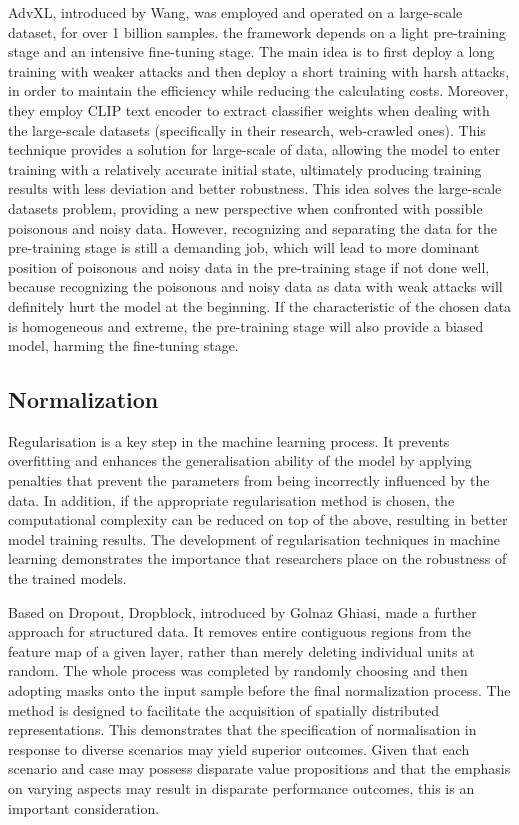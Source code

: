 \documentclass{article}
\begin{document}
AdvXL\cite{wang2024revisitingadversarialtrainingscale}, introduced by Wang, was employed and operated on a large-scale dataset, for over 1 billion samples. the framework depends on a light pre-training stage and an intensive fine-tuning stage. The main idea is to first deploy a long training with weaker attacks and then deploy a short training with harsh attacks, in order to maintain the efficiency while reducing the calculating costs. Moreover, they employ CLIP text encoder to extract classifier weights when dealing with the large-scale datasets (specifically in their research, web-crawled ones). This technique provides a solution for large-scale of data, allowing the model to enter training with a relatively accurate initial state, ultimately producing training results with less deviation and better robustness. This idea solves the large-scale datasets problem, providing a new perspective when confronted with possible poisonous and noisy data. However, recognizing and separating the data for the pre-training stage is still a demanding job, which will lead to more dominant position of poisonous and noisy data in the pre-training stage if not done well, because recognizing the poisonous and noisy data as data with weak attacks will definitely hurt the model at the beginning. If the characteristic of the chosen data is homogeneous and extreme,  the pre-training stage will also provide a biased model, harming the fine-tuning stage.


\subsection{Normalization}

Regularisation is a key step in the machine learning process. It prevents overfitting and enhances the generalisation ability of the model by applying penalties that prevent the parameters from being incorrectly influenced by the data. In addition, if the appropriate regularisation method is chosen, the computational complexity can be reduced on top of the above, resulting in better model training results. The development of regularisation techniques in machine learning demonstrates the importance that researchers place on the robustness of the trained models.

Based on Dropout, Dropblock\cite{ghiasi2018dropblockregularizationmethodconvolutional}, introduced by Golnaz Ghiasi, made a further approach for structured data. It removes entire contiguous regions from the feature map of a given layer, rather than merely deleting individual units at random. The whole process was completed by randomly choosing and then adopting masks onto the input sample before the final normalization process. The method is designed to facilitate the acquisition of spatially distributed representations.  This demonstrates that the specification of normalisation in response to diverse scenarios may yield superior outcomes. Given that each scenario and case may possess disparate value propositions and that the emphasis on varying aspects may result in disparate performance outcomes, this is an important consideration.
\end{document}
